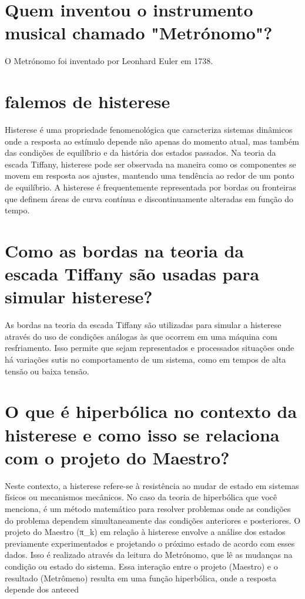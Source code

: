 \documentclass[11pt,a4paper]{article}
\begin{document}
\section{Quem inventou o instrumento musical chamado "Metrónomo"?}
O Metrónomo foi inventado por Leonhard Euler em 1738.

\section{falemos de histerese}
Histerese é uma propriedade fenomenológica que caracteriza sistemas dinâmicos onde a resposta ao estímulo depende não apenas do momento atual, mas também das condições de equilíbrio e da história dos estados passados. Na teoria da escada Tiffany, histerese pode ser observada na maneira como os componentes se movem em resposta aos ajustes, mantendo uma tendência ao redor de um ponto de equilíbrio. A histerese é frequentemente representada por bordas ou fronteiras que definem áreas de curva contínua e discontinuamente alteradas em função do tempo.

\section{Como as bordas na teoria da escada Tiffany são usadas para simular histerese?}
As bordas na teoria da escada Tiffany são utilizadas para simular a histerese através do uso de condições análogas às que ocorrem em uma máquina com resfriamento. Isso permite que sejam representados e processados situações onde há variações sutis no comportamento de um sistema, como em tempos de alta tensão ou baixa tensão.

\section{O que é hiperbólica no contexto da histerese e como isso se relaciona com o projeto do Maestro?}
Neste contexto, a histerese refere-se à resistência ao mudar de estado em sistemas físicos ou mecanismos mecânicos. No caso da teoria de hiperbólica que você menciona, é um método matemático para resolver problemas onde as condições do problema dependem simultaneamente das condições anteriores e posteriores. O projeto do Maestro (π\_k) em relação à histerese envolve a análise dos estados previamente experimentados e projetando o próximo estado de acordo com esses dados. Isso é realizado através da leitura do Metrónomo, que lê as mudanças na condição ou estado do sistema. Essa interação entre o projeto (Maestro) e o resultado (Metrômeno) resulta em uma função hiperbólica, onde a resposta depende dos anteced
\end{document}
